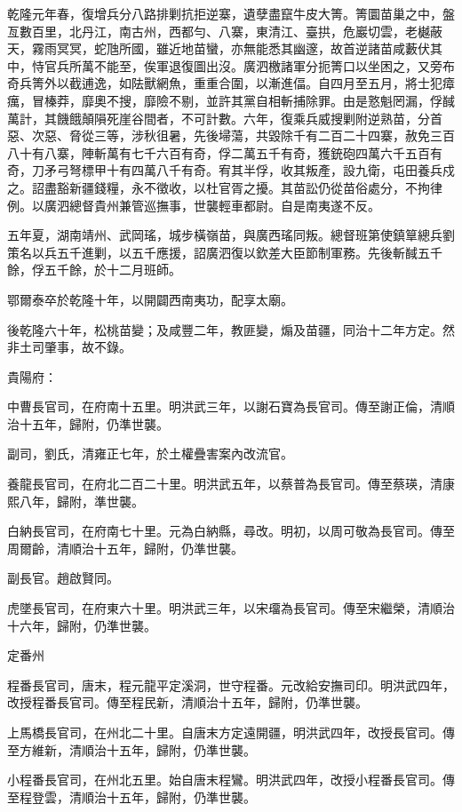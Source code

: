\begin{pinyinscope}
乾隆元年春，復增兵分八路排剿抗拒逆寨，遺孽盡竄牛皮大箐。箐圜苗巢之中，盤亙數百里，北丹江，南古州，西都勻、八寨，東清江、臺拱，危巖切雲，老樾蔽天，霧雨冥冥，蛇虺所國，雖近地苗蠻，亦無能悉其幽邃，故首逆諸苗咸藪伏其中，恃官兵所萬不能至，俟軍退復圖出沒。廣泗檄諸軍分扼箐口以坐困之，又旁布奇兵箐外以截逋逸，如阹獸網魚，重重合圍，以漸進偪。自四月至五月，將士犯瘴癘，冒榛莽，靡奧不搜，靡險不剔，並許其黨自相斬捕除罪。由是憝魁罔漏，俘馘萬計，其饑餓顛隕死崖谷間者，不可計數。六年，復乘兵威搜剿附逆熟苗，分首惡、次惡、脅從三等，涉秋徂暑，先後埽蕩，共毀除千有二百二十四寨，赦免三百八十有八寨，陣斬萬有七千六百有奇，俘二萬五千有奇，獲銃砲四萬六千五百有奇，刀矛弓弩標甲十有四萬八千有奇。宥其半俘，收其叛產，設九衛，屯田養兵戍之。詔盡豁新疆錢糧，永不徵收，以杜官胥之擾。其苗訟仍從苗俗處分，不拘律例。以廣泗總督貴州兼管巡撫事，世襲輕車都尉。自是南夷遂不反。

五年夏，湖南靖州、武岡瑤，城步橫嶺苗，與廣西瑤同叛。總督班第使鎮筸總兵劉策名以兵五千進剿，以五千應援，詔廣泗復以欽差大臣節制軍務。先後斬馘五千餘，俘五千餘，於十二月班師。

鄂爾泰卒於乾隆十年，以開闢西南夷功，配享太廟。

後乾隆六十年，松桃苗變；及咸豐二年，教匪變，煽及苗疆，同治十二年方定。然非土司肇事，故不錄。

貴陽府：

中曹長官司，在府南十五里。明洪武三年，以謝石寶為長官司。傳至謝正倫，清順治十五年，歸附，仍準世襲。

副司，劉氏，清雍正七年，於土權疊害案內改流官。

養龍長官司，在府北二百二十里。明洪武五年，以蔡普為長官司。傳至蔡瑛，清康熙八年，歸附，準世襲。

白納長官司，在府南七十里。元為白納縣，尋改。明初，以周可敬為長官司。傳至周爾齡，清順治十五年，歸附，仍準世襲。

副長官。趙啟賢同。

虎墜長官司，在府東六十里。明洪武三年，以宋璢為長官司。傳至宋繼榮，清順治十六年，歸附，仍準世襲。

定番州

程番長官司，唐末，程元龍平定溪洞，世守程番。元改給安撫司印。明洪武四年，改授程番長官司。傳至程民新，清順治十五年，歸附，仍準世襲。

上馬橋長官司，在州北二十里。自唐末方定遠開疆，明洪武四年，改授長官司。傳至方維新，清順治十五年，歸附，仍準世襲。

小程番長官司，在州北五里。始自唐末程鸞。明洪武四年，改授小程番長官司。傳至程登雲，清順治十五年，歸附，仍準世襲。


\end{pinyinscope}
